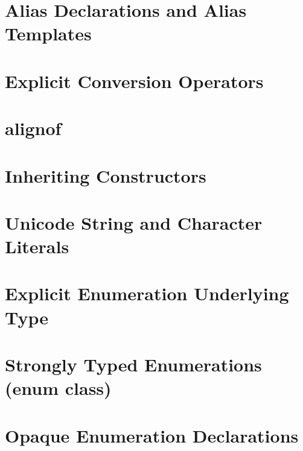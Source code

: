 \newpage
\section[Alias Declarations and Alias Templates]{Alias Declarations and Alias Templates}\label{alias-declarations-and-alias-templates}


\newpage
\section[Explicit Conversions]{Explicit Conversion Operators}\label{explicit-conversion-operators}


\newpage
\section[{\tt alignof}]{{\SecCode alignof}}\label{alignof}


\newpage
\section[Inheriting Constructors]{Inheriting Constructors}\label{ctorinheriting}\label{inheriting-constructors}


\newpage
\section[Unicode String and Character Literals]{Unicode String and Character Literals}\label{unicode-string-and-character-literals}


\newpage
\section[Explicit Enumeration Underlying Type]{Explicit Enumeration Underlying Type}\label{explicit-enumeration-underlying-type}


\newpage
\section[{\tt enum} {\tt class}]{Strongly Typed Enumerations ({\SecCode enum} {\SecCode class})}\label{enumclass}


\newpage
\section[Opaque Enumeration Declarations]{Opaque Enumeration Declarations}\label{enumopaque}


